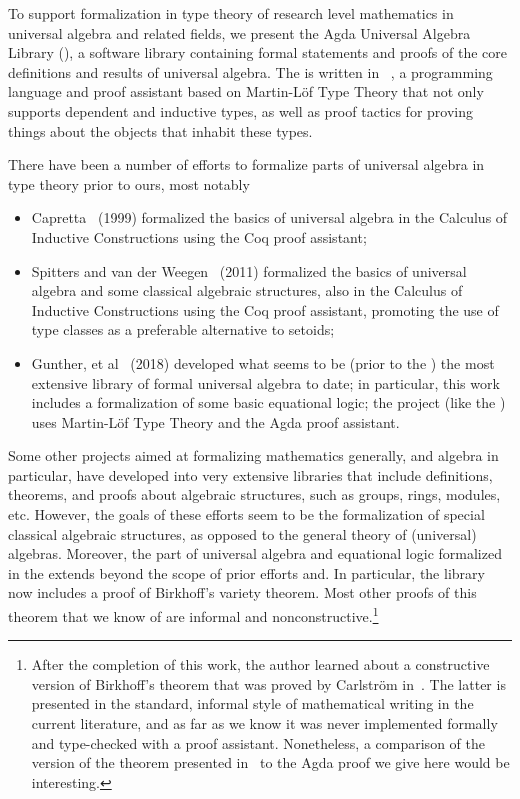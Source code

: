 To support formalization in type theory of research level mathematics in universal algebra and related fields, we present the Agda Universal Algebra Library (\agdaualib), a software library containing formal statements and proofs of the core definitions and results of universal algebra. 
The \ualib is written in \agda~\cite{Norell:2009}, a programming language and proof assistant based on Martin-L\"of Type Theory that not only supports dependent and inductive types, as well as proof tactics for proving things about the objects that inhabit these types.

There have been a number of efforts to formalize parts of universal algebra in type theory prior to ours, most notably
\begin{itemize}
  \item Capretta~\cite{Capretta:1999} (1999) formalized the basics of universal algebra in the Calculus of Inductive Constructions using the Coq proof assistant;
    \item Spitters and van der Weegen~\cite{Spitters:2011} (2011) formalized the basics of universal algebra and some classical algebraic structures, also in the Calculus of Inductive Constructions using the Coq proof assistant, promoting the use of type classes as a preferable alternative to setoids;
 \item Gunther, et al~\cite{Gunther:2018} (2018) developed what seems to be (prior to the \ualib) the most extensive library of formal universal algebra to date; in particular, this work includes a formalization of some basic equational logic; the project (like the \ualib) uses Martin-L\"of Type Theory and the Agda proof assistant.
\end{itemize}
Some other projects aimed at formalizing mathematics generally, and algebra in particular, have developed into very extensive libraries that include definitions, theorems, and proofs about algebraic structures, such as groups, rings, modules, etc.  However, the goals of these efforts seem to be the formalization of special classical algebraic structures, as opposed to the general theory of (universal) algebras. Moreover, the part of universal algebra and equational logic formalized in the \ualib extends beyond the scope of prior efforts and. In particular, the library now includes a proof of Birkhoff's variety theorem.  Most other proofs of this theorem that we know of are informal and nonconstructive.\footnote{After the completion of this work, the author learned about a constructive version of Birkhoff's theorem that was proved by Carlstr\"om in~\cite{Carlstrom:2008}.  The latter is presented in the standard, informal style of mathematical writing in the current literature, and as far as we know it was never implemented formally and type-checked with a proof assistant. Nonetheless, a comparison of the version of the theorem presented in~\cite{Carlstrom:2008} to the Agda proof we give here would be interesting.}

